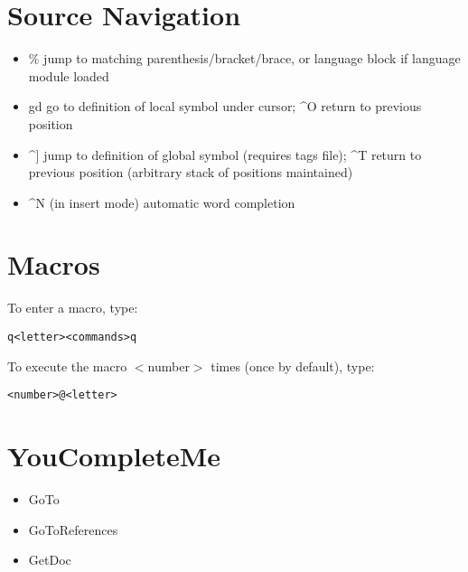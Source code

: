 \documentclass{article}
\begin{document}
\section{Source Navigation}
\begin{itemize}
    \item \% jump to matching parenthesis/bracket/brace, or language block if language module loaded
    \item gd go to definition of local symbol under cursor; \textasciicircum O return to previous position
    \item \textasciicircum ] jump to definition of global symbol (requires tags file); \textasciicircum T return to previous position (arbitrary stack of positions maintained)
    \item \textasciicircum N (in insert mode) automatic word completion
    \end{itemize}

    \section{Macros}
    To enter a macro, type:\\
\begin{verbatim}
q<letter><commands>q
\end{verbatim}

To execute the macro $<$number$>$ times (once by default), type:
\begin{verbatim}
<number>@<letter>
\end{verbatim}

\section{YouCompleteMe}
\begin{itemize}
    \item GoTo
    \item GoToReferences
    \item GetDoc
\end{itemize}
\end{document}
